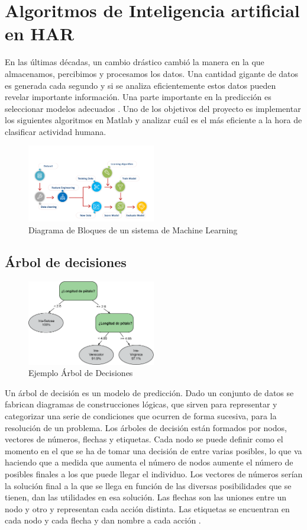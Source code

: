 \documentclass[11pt]{report}
\begin{document}
\section{Algoritmos de Inteligencia artificial en HAR}
En las últimas décadas, un cambio drástico cambió la manera en la que almacenamos, percibimos y procesamos los datos. Una cantidad gigante de datos es generada cada segundo y si se analiza eficientemente estos datos pueden revelar importante información. Una parte importante en la predicción es seleccionar modelos adecuados \cite{ApplicationHAR}. Uno de los objetivos del proyecto es implementar los siguientes algoritmos en Matlab y analizar cuál es el más eficiente a la hora de clasificar actividad humana.
\begin{figure}[h]
  \centering
    \includegraphics[width=0.5\textwidth]{machinelearning}
   \caption{Diagrama de Bloques de un sistema de Machine Learning \cite{huang}}
\end{figure}
\subsection {Árbol de decisiones}
\begin{figure}[h]
  \centering
    \includegraphics[width=0.5\textwidth]{decision}
   \caption{Ejemplo Árbol de Decisiones \cite{decisiont}}
\end{figure}
 Un árbol de decisión es un modelo de predicción. Dado un conjunto de datos se fabrican diagramas de construcciones lógicas, que sirven para representar y categorizar una serie de condiciones que ocurren de forma sucesiva, para la resolución de un problema. Los árboles de decisión están formados por nodos, vectores de números, flechas y etiquetas. Cada nodo se puede definir como el momento en el que se ha de tomar una decisión de entre varias posibles, lo que va haciendo que a medida que aumenta el número de nodos aumente el número de posibles finales a los que puede llegar el individuo. Los vectores de números serían la solución final a la que se llega en función de las diversas posibilidades que se tienen, dan las utilidades en esa solución. Las flechas son las uniones entre un nodo y otro y representan cada acción distinta. Las etiquetas se encuentran en cada nodo y cada flecha y dan nombre a cada acción \cite{ApplicationHAR}.
\end{document}
